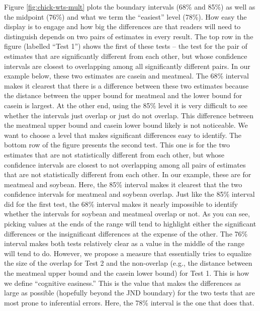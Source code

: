 Figure \ref{fig:chick-wts-mult} plots the boundary intervals (68\% and 85\%) as well as the midpoint (76\%) and what we term the ``easiest'' level (78\%). How easy the display is to engage and how big the differences are that readers will need to distinguish depends on two pairs of estimates in every result. The top row in the figure (labelled ``Test 1'') shows the first of these tests -- the test for the pair of estimates that are significantly different from each other, but whose confidence intervals are closest to overlapping among all significantly different pairs. In our example below, these two estimates are casein and meatmeal. The 68\% interval makes it clearest that there is a difference between these two estimates because the distance between the upper bound for meatmeal and the lower bound for casein is largest. At the other end, using the 85\% level it is very difficult to see whether the intervals just overlap or just do not overlap. This difference between the meatmeal upper bound and casein lower bound likely is not noticeable. We want to choose a level that makes significant differences easy to identify. The bottom row of the figure presents the second test. This one is for the two estimates that are not statistically different from each other, but whose confidence intervals are closest to not overlapping among all pairs of estimates that are not statistically different from each other. In our example, these are for meatmeal and soybean. Here, the 85\% interval makes it clearest that the two confidence intervals for meatmeal and soybean overlap. Just like the 85\% interval did for the first test, the 68\% interval makes it nearly impossible to identify whether the intervals for soybean and meatmeal overlap or not. As you can see, picking values at the ends of the range will tend to highlight either the significant differences or the insignificant differences at the expense of the other. The 76\% interval makes both tests relatively clear as a value in the middle of the range will tend to do. However, we propose a measure that essentially tries to equalize the size of the overlap for Test 2 and the non-overlap (e.g., the distance between the meatmeal upper bound and the casein lower bound) for Test 1. This is how we define ``cognitive easiness.'' This is the value that makes the differences as large as possible (hopefully beyond the JND boundary) for the two tests that are most prone to inferential errors. Here, the 78\% interval is the one that does that.

